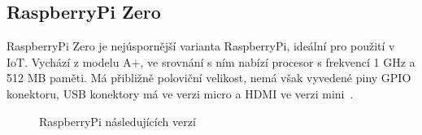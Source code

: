 	
\subsection{RaspberryPi Zero}
		RaspberryPi Zero je nejúspornější varianta RaspberryPi, ideální pro použití v IoT. Vychází z modelu A+, ve srovnání s ním nabízí procesor s frekvencí 1 GHz a 512 MB paměti. Má přibližně poloviční velikost, nemá však vyvedené piny GPIO konektoru, USB konektory má ve verzi micro a HDMI ve verzi mini~\cite{RaspiZero}.

\begin{figure}[!ht]
    \centering
			\hspace*{5mm}
			\hspace*{5mm}
		\caption{RaspberryPi následujících verzí}
\end{figure}



